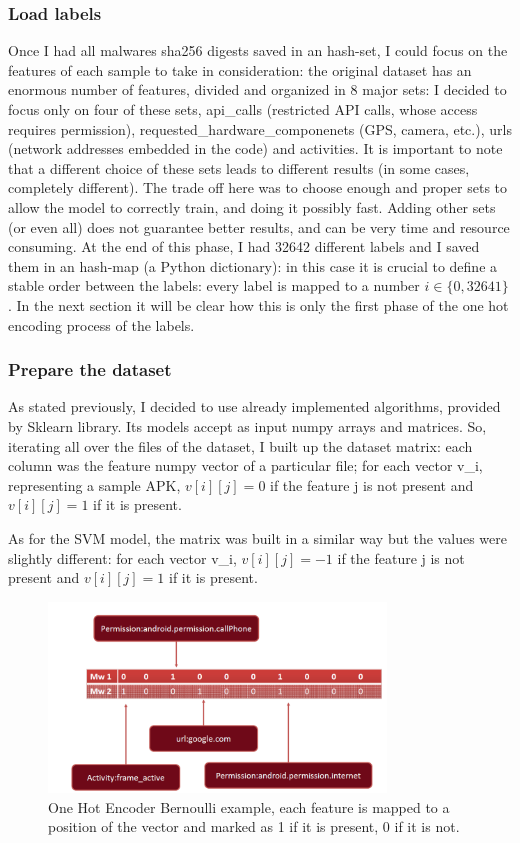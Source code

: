 \documentclass[12pt]{article}
\begin{document}
\subsubsection{Load labels}
Once I had all malwares sha256 digests saved in an hash-set, I could focus on the features of each sample to take in consideration: the original dataset has an enormous number of features, divided and organized in 8 major sets: I decided to focus only on four of these sets, api\_calls (restricted API calls, whose access requires permission), requested\_hardware\_componenets (GPS, camera, etc.), urls (network addresses embedded in the code) and activities. It is important to note that a different choice of these sets leads to different results (in some cases, completely different). The trade off here was to choose enough and proper sets to allow the model to correctly train, and doing it possibly fast. Adding other sets (or even all) does not guarantee better results, and can be very time and resource consuming. 
At the end of this phase, I had 32642 different labels and I saved them in an hash-map (a Python dictionary): in this case it is crucial to define a stable order between the labels: every label is mapped to a number $i \in \{0, 32641\}$.
In the next section it will be clear how this is only the first phase of the one hot encoding process of the labels.

\subsubsection{Prepare the dataset}
As stated previously, I decided to use already implemented algorithms, provided by Sklearn library. Its models accept as input numpy arrays and matrices. So, iterating all over the files of the dataset, I built up the dataset matrix: each column was the feature numpy vector of a particular file; for each vector v\_i, representing a sample APK, $v[i][j] = 0$ if the feature j is not present and $v[i][j] = 1$ if it is present.

As for the SVM model, the matrix was built in a similar way but the values were slightly different: for each vector v\_i, $v[i][j] = -1$ if the feature j is not present and $v[i][j] = 1$ if it is present.

\begin{figure}[!ht]
	\centering %
	\includegraphics[width=0.8\textwidth]{hotencode.png} %
	\caption{One Hot Encoder Bernoulli example, each feature is mapped to a position of the vector and marked as 1 if it is present, 0 if it is not.} 
	\label{fig:1_hot_encode}
\end{figure}
\end{document}
